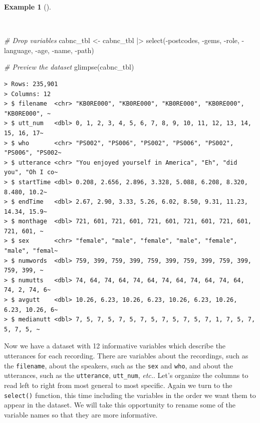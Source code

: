 \documentclass[
  letterpaper,
  DIV=11,
  numbers=noendperiod]{scrreport}
\newenvironment{Shaded}{\begin{snugshade}}{\end{snugshade}}
\newcommand{\CommentTok}[1]{\textcolor[rgb]{0.00,0.00,0.00}{\textit{#1}}}
\newcommand{\FunctionTok}[1]{\textcolor[rgb]{0.00,0.00,0.00}{#1}}
\newcommand{\NormalTok}[1]{\textcolor[rgb]{0.00,0.00,0.00}{#1}}
\newcommand{\OtherTok}[1]{\textcolor[rgb]{0.00,0.00,0.00}{#1}}
\newcommand{\SpecialCharTok}[1]{\textcolor[rgb]{0.00,0.00,0.00}{#1}}
\theoremstyle{definition}
\newtheorem{example}{Example}[chapter]
\theoremstyle{remark}
\begin{document}
\begin{example}[]\protect\hypertarget{exm-cd-cabnc-drop-vars}{}\label{exm-cd-cabnc-drop-vars}

~

\begin{Shaded}
\begin{Highlighting}[]
\CommentTok{\# Drop variables}
\NormalTok{cabnc\_tbl }\OtherTok{\textless{}{-}} 
\NormalTok{  cabnc\_tbl }\SpecialCharTok{|\textgreater{}} 
  \FunctionTok{select}\NormalTok{(}\SpecialCharTok{{-}}\NormalTok{postcodes, }\SpecialCharTok{{-}}\NormalTok{gems, }\SpecialCharTok{{-}}\NormalTok{role, }\SpecialCharTok{{-}}\NormalTok{language, }\SpecialCharTok{{-}}\NormalTok{age, }\SpecialCharTok{{-}}\NormalTok{name, }\SpecialCharTok{{-}}\NormalTok{path)}

\CommentTok{\# Preview the dataset}
\FunctionTok{glimpse}\NormalTok{(cabnc\_tbl)}
\end{Highlighting}
\end{Shaded}

\begin{verbatim}
> Rows: 235,901
> Columns: 12
> $ filename  <chr> "KB0RE000", "KB0RE000", "KB0RE000", "KB0RE000", "KB0RE000", ~
> $ utt_num   <dbl> 0, 1, 2, 3, 4, 5, 6, 7, 8, 9, 10, 11, 12, 13, 14, 15, 16, 17~
> $ who       <chr> "PS002", "PS006", "PS002", "PS006", "PS002", "PS006", "PS002~
> $ utterance <chr> "You enjoyed yourself in America", "Eh", "did you", "Oh I co~
> $ startTime <dbl> 0.208, 2.656, 2.896, 3.328, 5.088, 6.208, 8.320, 8.480, 10.2~
> $ endTime   <dbl> 2.67, 2.90, 3.33, 5.26, 6.02, 8.50, 9.31, 11.23, 14.34, 15.9~
> $ monthage  <dbl> 721, 601, 721, 601, 721, 601, 721, 601, 721, 601, 721, 601, ~
> $ sex       <chr> "female", "male", "female", "male", "female", "male", "femal~
> $ numwords  <dbl> 759, 399, 759, 399, 759, 399, 759, 399, 759, 399, 759, 399, ~
> $ numutts   <dbl> 74, 64, 74, 64, 74, 64, 74, 64, 74, 64, 74, 64, 74, 2, 74, 6~
> $ avgutt    <dbl> 10.26, 6.23, 10.26, 6.23, 10.26, 6.23, 10.26, 6.23, 10.26, 6~
> $ medianutt <dbl> 7, 5, 7, 5, 7, 5, 7, 5, 7, 5, 7, 5, 7, 1, 7, 5, 7, 5, 7, 5, ~
\end{verbatim}

\end{example}

Now we have a dataset with 12 informative variables which describe the
utterances for each recording. There are variables about the recordings,
such as the \texttt{filename}, about the speakers, such as the
\texttt{sex} and \texttt{who}, and about the utterances, such as the
\texttt{utterance}, \texttt{utt\_num}, \emph{etc.}. Let's organize the
columns to read left to right from most general to most specific. Again
we turn to the \texttt{select()} function, this time including the
variables in the order we want them to appear in the dataset. We will
take this opportunity to rename some of the variable names so that they
are more informative.
\end{document}
